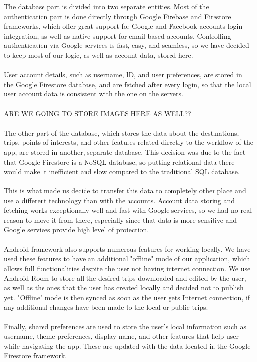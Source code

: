 The database part is divided into two separate entities. Most of the authentication part is done directly through Google Firebase and Firestore frameworks, which offer great support for Google and Facebook accounts login integration, as well as native support for email based accounts. Controlling authentication via Google services is fast, easy, and seamless, so we have decided to keep most of our logic, as well as account data, stored here. \\ \\
User account details, such as username, ID, and user preferences, are stored in the Google Firestore database, and are fetched after every login, so that the local user account data is consistent with the one on the servers. \\ \\
ARE WE GOING TO STORE IMAGES HERE AS WELL??\\ \\
The other part of the database, which stores the data about the destinations, trips, points of interests, and other features related directly to the workflow of the app, are stored in another, separate database. This decision was due to the fact that Google Firestore is a NoSQL database, so putting relational data there would make it inefficient and slow compared to the traditional SQL database.\\ \\
This is what made us decide to transfer this data to completely other place and use a different technology than with the accounts. Account data storing and fetching works exceptionally well and fast with Google services, so we had no real reason to move it from there, especially since that data is more sensitive and Google services provide high level of protection. \\ \\
Android framework also supports numerous features for working locally. We have used these features to have an additional "offline" mode of our application, which allows full functionalities despite the user not having internet connection. We use Android Room to store all the desired trips downloaded and edited by the user, as well as the ones that the user has created locally and decided not to publish yet. "Offline" mode is then synced as soon as the user gets Internet connection, if any additional changes have been made to the local or public trips. \\ \\
Finally, shared preferences are used to store the user's local information such as username, theme preferences, display name, and other features that help user while navigating the app. These are updated with the data located in the Google Firestore framework.\\
\\

